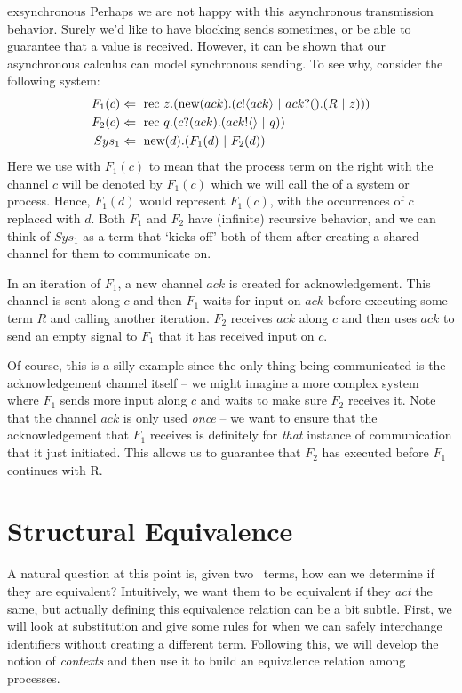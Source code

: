 	\begin{example}{exsynchronous}
	 Perhaps we are not happy with this asynchronous transmission behavior.  Surely we'd like to have blocking sends sometimes, or be able to guarantee that a value is received.  However, it can be shown that our asynchronous calculus can model synchronous sending.  To see why, consider the following system:
	\begin{align}
		F_1(c) & \Leftarrow\  \text{rec }{z}. (\text{new}({ack}).({c}!\langle{ack}\rangle \ |\  {ack}?({}).(R \ |\  z)))\\
		F_2(c) & \Leftarrow\  \text{rec }{q}. ({c}?({ack}).({ack}!\langle{}\rangle \ |\  q)) \\
		Sys_1 & \Leftarrow\  \text{new}({d}).(F_1(d) \ |\  F_2(d))
	\end{align}
	Here we use \pdef with $F_1(c)$ to mean that the process term on the right with the channel $c$ will be denoted by $F_1(c)$ which we will call the  of a system or process.  Hence, $F_1(d)$ would represent $F_1(c)$, with the occurrences of $c$ replaced with $d$.  Both $F_1$ and $F_2$ have (infinite) recursive behavior, and we can think of $Sys_1$ as a term that `kicks off' both of them after creating a shared channel for them to communicate on.  
	
	In an iteration of $F_1$, a new channel $ack$ is created for acknowledgement.  This channel is sent along $c$ and then $F_1$ waits for input on $ack$ before executing some term $R$ and calling another iteration.  $F_2$ receives $ack$ along $c$ and then uses $ack$ to send an empty signal to $F_1$ that it has received input on $c$.  
	
	Of course, this is a silly example since the only thing being communicated is the acknowledgement channel itself -- we might imagine a more complex system where $F_1$ sends more input along $c$ and waits to make sure $F_2$ receives it.  Note that the channel $ack$ is only used \emph{once} -- we want to ensure that the acknowledgement that $F_1$ receives is definitely for \emph{that} instance of communication that it just initiated.  This allows us to guarantee that $F_2$ has executed before $F_1$ continues with R.  \end{example}

\section{Structural Equivalence}
	A natural question at this point is, given two \picalc\ terms, how can we determine if they are equivalent?  Intuitively, we want them to be equivalent if they \emph{act} the same, but actually defining this equivalence relation can be a bit subtle.  First, we will look at substitution and give some rules for when we can safely interchange identifiers without creating a different term. Following this, we will develop the notion of \emph{contexts} and then use it to build an equivalence relation among processes.
